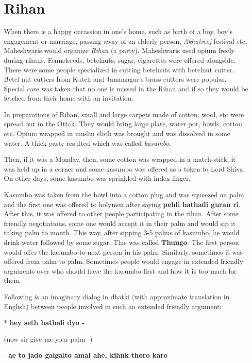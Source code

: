 \chapter{Rihan}
When there is a happy occassion in one's home, such as birth of a boy, boy's
engagement or marriage, passing away of an elderly person, \textit{Akhatreej}
festival etc. Maheshwaris would organize \textit{Rihan} (a party). Maheshwaris
used opium freely during rihans. Fennelseeds, betelnuts, sugar, cigarettes were
offered alongside. There were some people specialized in cutting betelnuts with
betelnut cutter. Betel nut cutters from Kutch and Jamanagar's brass cutters
were popular. Special care was taken that no one is missed in the Rihan and if
so they would be fetched from their home with an invitation.

In preparations of Rihan, small and large carpets made of cotton, wool, etc
were spread out in the Ottak. They would bring large plate, water pot, bowls,
cotton etc. Opium wrapped in muslin cloth was brought and was dissolved in some
water. A thick paste resulted which was called \textit{kasumbo}.

Then, if it was a Monday, then, some cotton was wrapped in a match-stick, it
was held up in a corner and some kasumbo was offered as a token to Lord Shiva.
On other days, some kasumbo was sprinkled with index finger.

Kasumbo was taken from the bowl into a cotton plug and was squeezed on palm and
the first one was offered to holymen after saying \textbf{pehli hathadi guran
ri}. After this, it was offered to other people participating in the rihan.
After some friendly negotiations, some one would accept it in their palm and
would sip it taking palm to mouth. This way, after sipping 3-5 palms of
kasumbo, he would drink water followed by some sugar. This was called
\textbf{Thungo}. The first person would offer the kasumbo to next person in his
palm. Similarly, sometimes it was offered from palm to palm. Sometimes people
would engage in extended friendly arguments over who should have the kasumbo
first and how it is too much for them.

Following is an imaginary dialog in dhatki (with approximate translation in
English) between people involved in such an extended friendly argument:

* \textbf{hey seth hathali dyo -}

(now sir give me your palm -)

- \textbf{ae to jado galgalto amal ahe, kihnk thoro karo}

